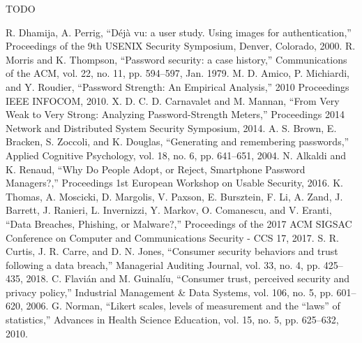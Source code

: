 \documentclass[letterpaper, 10 pt, conference]{ieeeconf}  %
\begin{document}
TODO







\begin{thebibliography}{99}

 R. Dhamija, A. Perrig, ``Déjà vu: a user study. Using images for authentication,'' Proceedings of the 9th USENIX Security Symposium, Denver, Colorado, 2000.
 R. Morris and K. Thompson, ``Password security: a case history,'' Communications of the ACM, vol. 22, no. 11, pp. 594–597, Jan. 1979.
 M. D. Amico, P. Michiardi, and Y. Roudier, ``Password Strength: An Empirical Analysis,'' 2010 Proceedings IEEE INFOCOM, 2010.
 X. D. C. D. Carnavalet and M. Mannan, ``From Very Weak to Very Strong: Analyzing Password-Strength Meters,'' Proceedings 2014 Network and Distributed System Security Symposium, 2014.
 A. S. Brown, E. Bracken, S. Zoccoli, and K. Douglas, ``Generating and remembering passwords,'' Applied Cognitive Psychology, vol. 18, no. 6, pp. 641–651, 2004.
 N. Alkaldi and K. Renaud, ``Why Do People Adopt, or Reject, Smartphone Password Managers?,'' Proceedings 1st European Workshop on Usable Security, 2016.
 K. Thomas, A. Moscicki, D. Margolis, V. Paxson, E. Bursztein, F. Li, A. Zand, J. Barrett, J. Ranieri, L. Invernizzi, Y. Markov, O. Comanescu, and V. Eranti, ``Data Breaches, Phishing, or Malware?,'' Proceedings of the 2017 ACM SIGSAC Conference on Computer and Communications Security - CCS 17, 2017.
 S. R. Curtis, J. R. Carre, and D. N. Jones, ``Consumer security behaviors and trust following a data breach,'' Managerial Auditing Journal, vol. 33, no. 4, pp. 425–435, 2018.
 C. Flavián and M. Guinalíu, ``Consumer trust, perceived security and privacy policy,'' Industrial Management \& Data Systems, vol. 106, no. 5, pp. 601–620, 2006.
 G. Norman, ``Likert scales, levels of measurement and the “laws” of statistics,'' Advances in Health Science Education, vol. 15, no. 5, pp. 625–632, 2010.


\end{thebibliography}
\end{document}
